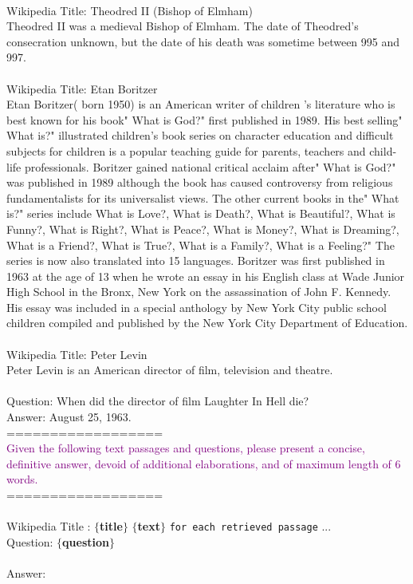 \begin{prompt}[title={Retrieved Passages with In-context Example}]
\\
Wikipedia Title: Theodred II (Bishop of Elmham) \\
Theodred II was a medieval Bishop of Elmham. The date of Theodred's consecration unknown, but the date of his death was sometime between 995 and 997. \\
\\
Wikipedia Title: Etan Boritzer \\
Etan Boritzer( born 1950) is an American writer of children 's literature who is best known for his book" What is God?" first published in 1989. His best selling" What is?" illustrated children's book series on character education and difficult subjects for children is a popular teaching guide for parents, teachers and child- life professionals. Boritzer gained national critical acclaim after" What is God?" was published in 1989 although the book has caused controversy from religious fundamentalists for its universalist views. The other current books in the" What is?" series include What is Love?, What is Death?, What is Beautiful?, What is Funny?, What is Right?, What is Peace?, What is Money?, What is Dreaming?, What is a Friend?, What is True?, What is a Family?, What is a Feeling?" The series is now also translated into 15 languages. Boritzer was first published in 1963 at the age of 13 when he wrote an essay in his English class at Wade Junior High School in the Bronx, New York on the assassination of John F. Kennedy. His essay was included in a special anthology by New York City public school children compiled and published by the New York City Department of Education. \\
\\
Wikipedia Title: Peter Levin \\
Peter Levin is an American director of film, television and theatre. \\
\\
Question: When did the director of film Laughter In Hell die? \\
Answer: August 25, 1963. \\
================== \\
\textcolor{purple}{Given the following text passages and questions, please present a concise, definitive answer, devoid of additional elaborations, and of maximum length of 6 words.} \\
================== \\
\\
Wikipedia Title : \textbf{$\{$title$\}$}
\textbf{$\{$text$\}$} \texttt{for each retrieved passage} ...  \\
Question: \textbf{$\{$question$\}$} \\
\\
Answer:
\end{prompt}

